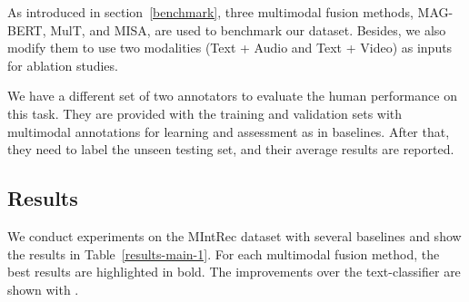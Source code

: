 \documentclass[sigconf,camera-ready]{acmart}
\begin{document}
As introduced in section~\ref{benchmark}, three multimodal fusion methods, MAG-BERT, MulT, and MISA, are used to benchmark our dataset. Besides, we also modify them to use two modalities (Text + Audio and Text + Video) as inputs for ablation studies. 

We have a different set of two annotators to evaluate the human performance on this task. They are provided with the training and validation sets with multimodal annotations for learning and assessment as in baselines. After that, they need to label the unseen testing set, and their average results are reported. 

\subsection{Results}
We conduct experiments on the MIntRec dataset with several baselines and show the results in Table~\ref{results-main-1}. For each multimodal fusion method, the best results are highlighted in bold. The improvements over the text-classifier are shown with .
\end{document}
